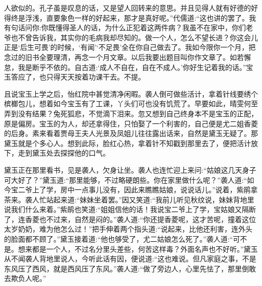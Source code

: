\begin{parag}
人欲似的。孔子虽是叹息的话，又是望人回转来的意思。并且见得人就有好德的好得终是浮浅，直要象色一样的好起来，那才是真好呢。”代儒道:“这也讲的罢了。我有句话问你:你既懂得圣人的话，为什么正犯着这两件病？我虽不在家中，你们老爷也不曾告诉我，其实你的毛病我却尽知的。做一个人，怎么不望长进？你这会儿正是‘后生可畏’的时候，‘有闻’‘不足畏’全在你自己做去了。我如今限你一个月，把念过的旧书全要理清，再念一个月文章。以后我要出题目叫你作文章了。如若懈怠，我是断乎不依的。自古道:‘成人不自在，自在不成人。’你好生记着我的话。”宝玉答应了，也只得天天按着功课干去。不提。
\end{parag}


\begin{parag}
    且说宝玉上学之后，怡红院中甚觉清净闲暇。袭人倒可做些活计，拿着针线要绣个槟榔包儿，想着如今宝玉有了工课，丫头们可也没有饥荒了。早要如此，晴雯何至弄到没有结果？兔死狐悲，不觉滴下泪来。忽又想到自己终身本不是宝玉的正配，原是偏房。宝玉的为人，却还拿得住，只怕娶了一个利害的，自己便是尤二姐香菱的后身。素来看着贾母王夫人光景及凤姐儿往往露出话来，自然是黛玉无疑了。那黛玉就是个多心人。想到此际，脸红心热，拿着针不知戳到那里去了，便把活计放下，走到黛玉处去探探他的口气。
\end{parag}


\begin{parag}
    黛玉正在那里看书，见是袭人，欠身让坐。袭人也连忙迎上来问:“姑娘这几天身子可大好了？”黛玉道:“那里能够，不过略硬朗些。你在家里做什么呢？”袭人道:“如今宝二爷上了学，房中一点事儿没有，因此来瞧瞧姑娘，说说话儿。”说着，紫鹃拿茶来。袭人忙站起来道:“妹妹坐着罢。”因又笑道:“我前儿听见秋纹说，妹妹背地里说我们什么来着。”紫鹃也笑道:“姐姐信他的话！我说宝二爷上了学，宝姑娘又隔断了，连香菱也不过来，自然是闷的。”袭人道:“你还提香菱呢，这才苦呢，撞着这位太岁奶奶，难为他怎么过！”把手伸着两个指头道:“说起来，比他还利害，连外头的脸面都不顾了。”黛玉接着道:“他也够受了，尤二姑娘怎么死了。”袭人道:“可不是。想来都是一个人，不过名分里头差些，何苦这样毒？外面名声也不好听。”黛玉从不闻袭人背地里说人，今听此话有因，便说道:“这也难说。但凡家庭之事，不是东风压了西风，就是西风压了东风。”袭人道:“做了旁边人，心里先怯了，那里倒敢去欺负人呢。”
\end{parag}


